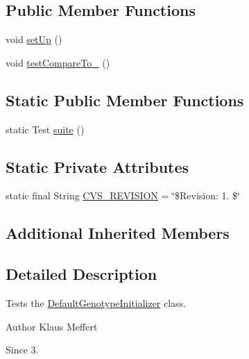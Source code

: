 \subsection*{Public Member Functions}
\begin{DoxyCompactItemize}
\item 
void \hyperlink{classorg_1_1jgap_1_1distr_1_1grid_1_1_default_genotype_initializer_test_a9b01820c51879bddc4fd8e14a65cc5ea}{set\-Up} ()
\item 
void \hyperlink{classorg_1_1jgap_1_1distr_1_1grid_1_1_default_genotype_initializer_test_a1820f872637803d96e90b8b58243e827}{test\-Compare\-To\-\_} ()
\end{DoxyCompactItemize}
\subsection*{Static Public Member Functions}
\begin{DoxyCompactItemize}
\item 
static Test \hyperlink{classorg_1_1jgap_1_1distr_1_1grid_1_1_default_genotype_initializer_test_a20bf5d68db9fa15d8cf9e3ebc2beaed6}{suite} ()
\end{DoxyCompactItemize}
\subsection*{Static Private Attributes}
\begin{DoxyCompactItemize}
\item 
static final String \hyperlink{classorg_1_1jgap_1_1distr_1_1grid_1_1_default_genotype_initializer_test_ac6bd36a4f18aee0339d8a450e9107472}{C\-V\-S\-\_\-\-R\-E\-V\-I\-S\-I\-O\-N} = \char`\"{}\$Revision\-: 1. \$\char`\"{}
\end{DoxyCompactItemize}
\subsection*{Additional Inherited Members}


\subsection{Detailed Description}
Tests the \hyperlink{classorg_1_1jgap_1_1distr_1_1grid_1_1_default_genotype_initializer}{Default\-Genotype\-Initializer} class.

\begin{DoxyAuthor}{Author}
Klaus Meffert 
\end{DoxyAuthor}
\begin{DoxySince}{Since}
3. 
\end{DoxySince}


